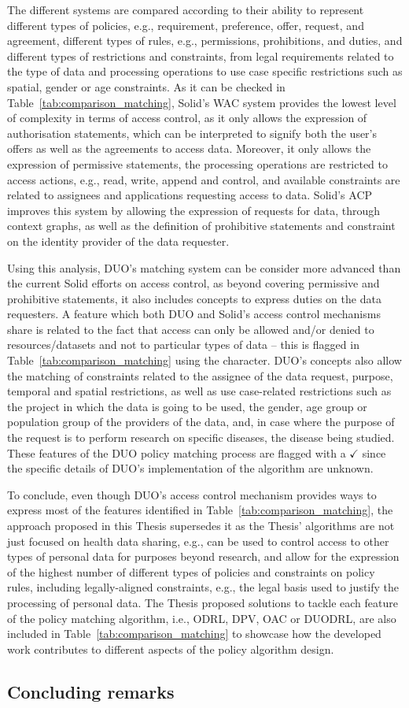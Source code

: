 The different systems are compared according to their ability to represent different types of policies, e.g., requirement, preference, offer, request, and agreement, different types of rules, e.g., permissions, prohibitions, and duties, and different types of restrictions and constraints, from legal requirements related to the type of data and processing operations to use case specific restrictions such as spatial, gender or age constraints.
As it can be checked in Table~\ref{tab:comparison_matching}, Solid's WAC system provides the lowest level of complexity in terms of access control, as it only allows the expression of authorisation statements, which can be interpreted to signify both the user's offers as well as the agreements to access data.
Moreover, it only allows the expression of permissive statements, the processing operations are restricted to access actions, e.g., read, write, append and control, and available constraints are related to assignees and applications requesting access to data.
Solid's ACP improves this system by allowing the expression of requests for data, through context graphs, as well as the definition of prohibitive statements and constraint on the identity provider of the data requester.

Using this analysis, DUO's matching system can be consider more advanced than the current Solid efforts on access control, as beyond covering permissive and prohibitive statements, it also includes concepts to express duties on the data requesters.
A feature which both DUO and Solid's access control mechanisms share is related to the fact that access can only be allowed and/or denied to resources/datasets and not to particular types of data -- this is flagged in Table~\ref{tab:comparison_matching} using the \textasteriskcentered{} character.
DUO's concepts also allow the matching of constraints related to the assignee of the data request, purpose, temporal and spatial restrictions, as well as use case-related restrictions such as the project in which the data is going to be used, the gender, age group or population group of the providers of the data, and, in case where the purpose of the request is to perform research on specific diseases, the disease being studied.
These features of the DUO policy matching process are flagged with a $\checkmark$ since the specific details of DUO's implementation of the algorithm are unknown.

To conclude, even though DUO's access control mechanism provides ways to express most of the features identified in Table~\ref{tab:comparison_matching}, the approach proposed in this Thesis supersedes it as the Thesis' algorithms are not just focused on health data sharing, e.g., can be used to control access to other types of personal data for purposes beyond research, and allow for the expression of the highest number of different types of policies and constraints on policy rules, including legally-aligned constraints, e.g., the legal basis used to justify the processing of personal data.
The Thesis proposed solutions to tackle each feature of the policy matching algorithm, i.e., ODRL, DPV, OAC or DUODRL, are also included in Table~\ref{tab:comparison_matching} to showcase how the developed work contributes to different aspects of the policy algorithm design.

\subsection{Concluding remarks}
\label{sec:conclusions_poc}